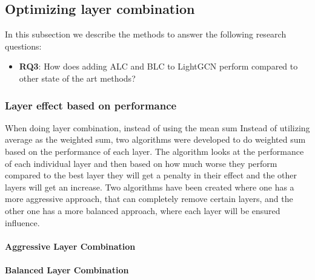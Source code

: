 \subsection{Optimizing layer combination}

In this subsection we describe the methods to answer the following research questions:
\begin{itemize}
    \item \textbf{RQ3}: How does adding ALC and BLC to LightGCN perform compared to other state of the art methods?
\end{itemize}  

\subsubsection{Layer effect based on performance} \label{fredsplit}
When doing layer combination, instead of using the mean sum
Instead of utilizing average as the weighted sum, two algorithms were developed to do weighted sum based on the performance of each layer.
The algorithm looks at the performance of each individual layer and then based on how much worse they perform compared to the best layer they will get a penalty in their effect and the other layers will get an increase.
Two algorithms have been created where one has a more aggressive approach, that can completely remove certain layers, and the other one has a more balanced approach, where each layer will be ensured influence.

\paragraph{Aggressive Layer Combination}


\paragraph{Balanced Layer Combination}


